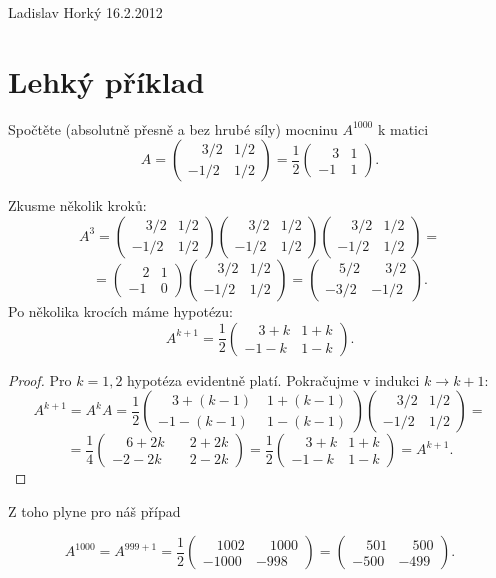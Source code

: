 \documentclass[12pt, a4paper]{report}
\begin{document}
Ladislav Horký \hfill 16.2.2012
\section{Lehký příklad}
Spočtěte (absolutně přesně a bez hrubé síly) mocninu $A^{1000}$ k matici
\[ A =
\begin{pmatrix}
\quad3/2 & 1/2  \\
-1/2 & 1/2
\end{pmatrix} =
\frac{1}{2}
\begin{pmatrix}
\quad3 & 1  \\
-1 & 1
\end{pmatrix}.
\]

\vspace{1cm}
Zkusme několik kroků:
\[ A^3 =
\begin{pmatrix} \quad3/2 & 1/2  \\ -1/2 & 1/2 \end{pmatrix}
\begin{pmatrix} \quad3/2 & 1/2  \\ -1/2 & 1/2 \end{pmatrix}
\begin{pmatrix} \quad3/2 & 1/2  \\ -1/2 & 1/2 \end{pmatrix} =
\]
\[
 = \begin{pmatrix} \quad2 & 1  \\ -1 & 0 \end{pmatrix}
\begin{pmatrix} \quad3/2 & 1/2  \\ -1/2 & 1/2 \end{pmatrix} =
\begin{pmatrix} \quad5/2 & \quad3/2  \\ -3/2 & -1/2 \end{pmatrix}.
\]
Po několika krocích máme hypotézu:
\[ A^{k+1} = \frac{1}{2}
\begin{pmatrix} \quad3+k & 1+k  \\ -1-k & 1-k \end{pmatrix}.
\]
\begin{proof}
Pro $k=1,2$ hypotéza evidentně platí. Pokračujme v indukci $k \rightarrow k+1$:
\[ A^{k+1} = A^k A = \frac{1}{2}
\begin{pmatrix} \quad3+(k-1) & \;1+(k-1)  \\ -1-(k-1) & \;1-(k-1) \end{pmatrix}
\begin{pmatrix} \quad3/2 & 1/2  \\ -1/2 & 1/2 \end{pmatrix} =
\]
\[
 = \frac{1}{4} \begin{pmatrix} \quad6+2k & \quad2+2k  \\ -2-2k & \quad2-2k \end{pmatrix} =
 \frac{1}{2}
\begin{pmatrix} \quad3+k & 1+k  \\ -1-k & 1-k \end{pmatrix} = A^{k+1}.
\]
\end{proof}

Z toho plyne pro náš případ

\[ A^{1000} = A^{999+1} = \frac{1}{2}
\begin{pmatrix} \quad1002 & \quad1000  \\ -1000 & -998 \end{pmatrix} =
\begin{pmatrix} \quad501 & \quad500  \\ -500 & -499 \end{pmatrix}.
\]
\end{document}
